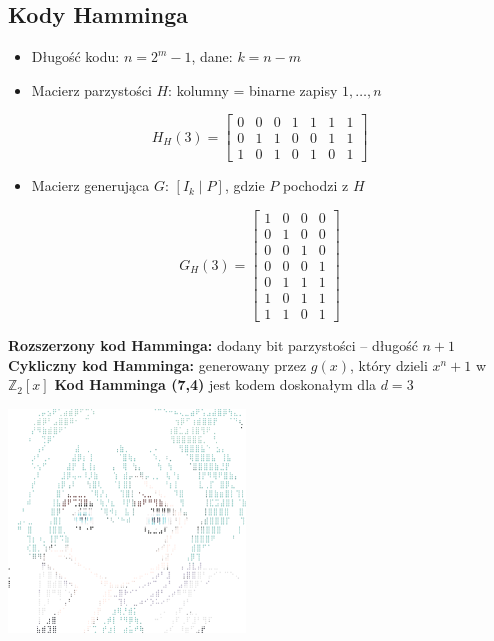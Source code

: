 \documentclass{../konspekt}
\begin{document}
\begin{multicols}{2}
  \section*{Kody Hamminga}

  \begin{itemize}
    \item Długość kodu: $n = 2^m - 1$, dane: $k = n - m$
    \item Macierz parzystości $H$: kolumny = binarne zapisy $1, \dots, n$
  \end{itemize}
  \vspace{-0.5em}
  \[
    H_H(3) =
    \begin{bmatrix}
      0 & 0 & 0 & 1 & 1 & 1 & 1 \\
      0 & 1 & 1 & 0 & 0 & 1 & 1 \\
      1 & 0 & 1 & 0 & 1 & 0 & 1
    \end{bmatrix}
  \]

  \begin{itemize}
    \item Macierz generująca $G$: $[I_k \mid P]$, gdzie $P$ pochodzi z $H$
  \end{itemize}
  \vspace{-0.5em}
  \[
    G_H(3) =
    \begin{bmatrix}
      1 & 0 & 0 & 0 \\
      0 & 1 & 0 & 0 \\
      0 & 0 & 1 & 0 \\
      0 & 0 & 0 & 1 \\
      0 & 1 & 1 & 1 \\
      1 & 0 & 1 & 1 \\
      1 & 1 & 0 & 1
    \end{bmatrix}
  \]

  \textbf{Rozszerzony kod Hamminga:} dodany bit parzystości – długość $n + 1$
  \textbf{Cykliczny kod Hamminga:} generowany przez $g(x)$, który
  dzieli $x^n + 1$ w $\mathbb{Z}_2[x]$
  \textbf{Kod Hamminga (7,4)} jest kodem doskonałym dla $d = 3$

  \begin{multicols}{2}

    \begin{center}
      \includegraphics[width=17em]{emotionalSupportMiku.png} %


\end{center}
\end{multicols}
\end{multicols}
\end{document}
